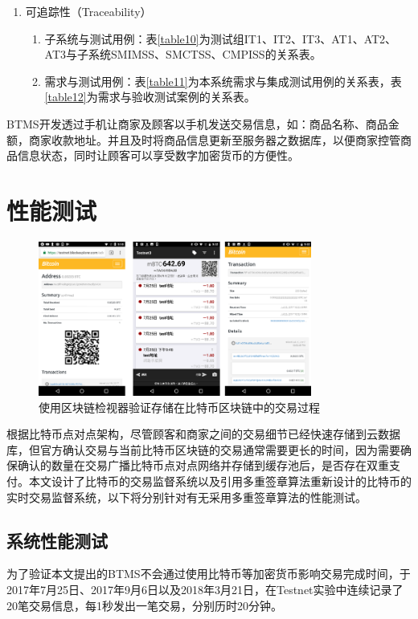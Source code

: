 \begin{enumerate}
			\item 可追踪性（Traceability）

						

			\begin{enumerate}
				\item 子系统与测试用例：表\ref{table10}为测试组IT1、IT2、IT3、AT1、AT2、AT3与子系统SMIMSS、SMCTSS、CMPISS的关系表。
				\item 需求与测试用例：表\ref{table11}为本系统需求与集成测试用例的关系表，表\ref{table12}为需求与验收测试案例的关系表。
				\end{enumerate}
		\end{enumerate}

	BTMS开发透过手机让商家及顾客以手机发送交易信息，如：商品名称、商品金额，商家收款地址。并且及时将商品信息更新至服务器之数据库，以便商家控管商品信息状态，同时让顾客可以享受数字加密货币的方便性。

	\section{性能测试}


		\begin{figure}[!htbp]
			\centering
			\includegraphics[width = 0.8\textwidth]{fig9.png}
			\caption{使用区块链检视器验证存储在比特币区块链中的交易过程}\label{fig9}
		\end{figure}


		根据比特币点对点架构，尽管顾客和商家之间的交易细节已经快速存储到云数据库，但官方确认交易与当前比特币区块链的交易通常需要更长的时间，因为需要确保确认的数量在交易广播比特币点对点网络并存储到缓存池后，是否存在双重支付。本文设计了比特币的交易监督系统以及引用多重签章算法重新设计的比特币的实时交易监督系统，以下将分别针对有无采用多重签章算法的性能测试。


		\subsection{系统性能测试}
		为了验证本文提出的BTMS不会通过使用比特币等加密货币影响交易完成时间，于2017年7月25日、2017年9月6日以及2018年3月21日，在Testnet实验中连续记录了20笔交易信息，每1秒发出一笔交易，分别历时20分钟。

